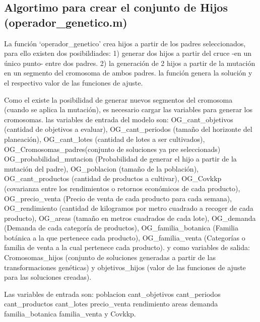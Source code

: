 \documentclass[11pt]{article}
\begin{document}
    \hypertarget{algortimo-para-crear-el-conjunto-de-hijos-operador_genetico.m}{%
\subsection{Algortimo para crear el conjunto de Hijos
(operador\_genetico.m)}\label{algortimo-para-crear-el-conjunto-de-hijos-operador_genetico.m}}

La función `operador\_genetico' crea hijos a partir de los padres
seleccionados, para ello existen dos posibildiades: 1) generar dos hijos
a partir del cruce -en un único punto- entre dos padres. 2) la
generación de 2 hijos a partir de la mutación en un segmento del
cromosoma de ambos padres. la función genera la solución y el respectivo
valor de las funciones de ajuste.

Como el existe la posibilidad de generar nuevos segmentos del cromosoma
(cuando se aplica la mutación), es necesario cargar las variables para
generar los cromosomas. las variables de entrada del modelo son:
OG\_cant\_objetivos (cantidad de objetivos a evaluar),
OG\_cant\_periodos (tamaño del horizonte del planeación),
OG\_cant\_lotes (cantidad de lotes a ser cultivados),
OG\_Cromosomas\_padres(conjunto de soluciones ya pre seleccionads)
OG\_probabilidad\_mutacion (Probabilidad de generar el hijo a partir de
la mutación del padre), OG\_poblacion (tamaño de la población),
OG\_cant\_productos (cantidad de productos a cultivar), OG\_Covkkp
(covarianza entre los rendimientos o retornos económicos de cada
producto), OG\_precio\_venta (Precio de venta de cada producto para cada
semana), OG\_rendimiento (cantidad de kilogramos por metro cuadrado a
recoger de cada producto), OG\_areas (tamaño en metros cuadrados de cada
lote), OG\_demanda (Demanda de cada categoría de productos),
OG\_familia\_botanica (Familia botánica a la que pertenece cada
producto), OG\_familia\_venta (Categorías o familia de venta a la cual
pertenece cada producto). y como variables de salida: Cromosomas\_hijos
(conjunto de soluciones generadas a partir de las transformaciones
genéticas) y objetivos\_hijos (valor de las funciones de ajuste para las
soluciones creadas).

Las variables de entrada son: poblacion cant\_objetivos cant\_periodos
cant\_productos cant\_lotes precio\_venta rendimiento areas demanda
familia\_botanica familia\_venta y Covkkp.
\end{document}
